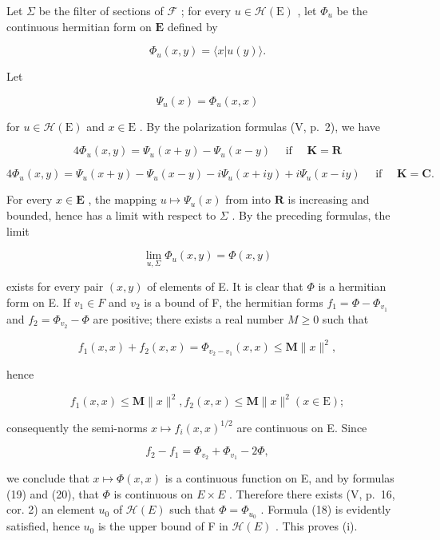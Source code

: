 Let \(\Sigma\) be the filter of sections of \(\mathcal{F}\) ; for every \(u \in \mathcal{H}(\mathrm{E})\) , let \(\Phi_u\) be the continuous hermitian form on \(\mathbf{E}\) defined by

\[
\Phi_ {u} (x, y) = \langle x | u (y) \rangle .
\]

Let

\[
\Psi_ {u} (x) = \Phi_ {u} (x, x)
\]

for \(u \in \mathcal{H}(\mathrm{E})\) and \(x \in \mathrm{E}\) . By the polarization formulas (V, p.~2), we have

\[
4 \Phi_ {u} (x, y) = \Psi_ {u} (x + y) - \Psi_ {u} (x - y) \quad \text { if } \quad \mathbf {K} = \mathbf {R}\tag{19}
\]

\[
4 \Phi_ {u} (x, y) = \Psi_ {u} (x + y) - \Psi_ {u} (x - y) - i \Psi_ {u} (x + i y) + i \Psi_ {u} (x - i y) \quad \text { if } \quad \mathbf {K} = \mathbf {C}.\tag{20}
\]

For every \(x \in \mathbf{E}\) , the mapping \(u \mapsto \Psi_u(x)\) from into \(\mathbf{R}\) is increasing and bounded, hence has a limit with respect to \(\Sigma\) . By the preceding formulas, the limit

\[
\lim _ {u, \Sigma} \Phi_ {u} (x, y) = \Phi (x, y)
\]

exists for every pair \((x, y)\) of elements of E. It is clear that \(\Phi\) is a hermitian form on E. If \(v_{1} \in F\) and \(v_{2}\) is a bound of F, the hermitian forms \(f_{1} = \Phi - \Phi_{v_{1}}\) and \(f_{2} = \Phi_{v_{2}} - \Phi\) are positive; there exists a real number \(M \geqslant 0\) such that

\[
f _ {1} (x, x) + f _ {2} (x, x) = \Phi_ {v _ {2} - v _ {1}} (x, x) \leqslant \mathbf {M} \| x \| ^ {2},
\]

hence

\[
f _ {1} (x, x) \leqslant \mathbf {M} \| x \| ^ {2}, f _ {2} (x, x) \leqslant \mathbf {M} \| x \| ^ {2} (x \in \mathrm{E});
\]

consequently the semi-norms \(x \mapsto f_i(x, x)^{1/2}\) are continuous on E. Since

\[
f _ {2} - f _ {1} = \Phi_ {v _ {2}} + \Phi_ {v _ {1}} - 2 \Phi ,
\]

we conclude that \(x \mapsto \Phi(x, x)\) is a continuous function on E, and by formulas (19) and (20), that \(\Phi\) is continuous on \(E \times E\) . Therefore there exists (V, p.~16, cor. 2) an element \(u_{0}\) of \(\mathcal{H}(E)\) such that \(\Phi = \Phi_{u_{0}}\) . Formula (18) is evidently satisfied, hence \(u_{0}\) is the upper bound of F in \(\mathcal{H}(E)\) . This proves (i).

